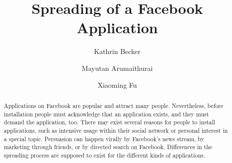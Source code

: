 \documentclass[preprint,12pt]{elsarticle}
\begin{document}
\begin{frontmatter}



\title{Spreading of a Facebook Application}



\author[focal]{Kathrin Becker} 
\author[focal]{Mayutan Arumaithurai} %
\author[focal]{Xiaoming Fu} %

\address[focal]{Institute of Computer Science, Computer Networks (NET)
  Research Group, University of G\"ottingen}








\begin{abstract}
Applications on Facebook are popular and attract many
people. Nevertheless, before installation people must acknowledge that an application
exists, and they must demand the application, too.
There may exist several reasons for people to install
applications, such as intensive usage within their social network or
personal interest in a special topic. Persuasion can
happen virally by Facebook's news stream, by marketing through
friends, or by directed search on 
Facebook. Differences in the spreading process are supposed to exist
for the different kinds of applications. 


\end{abstract}
\end{frontmatter}
\end{document}
